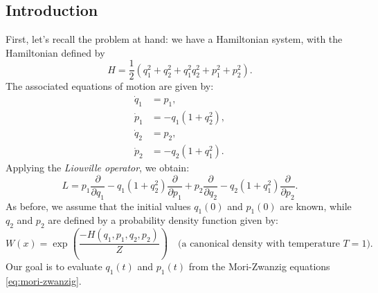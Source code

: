 \documentclass[12pt]{article}
\begin{document}
\subsection{Introduction}
First, let's recall the problem at hand: we have a Hamiltonian system, with the Hamiltonian defined by  
\begin{equation*}
    H = \frac{1}{2}(q_1^2 + q_2^2 + q_1^2 q_2^2 + p_1^2 + p_2^2).
\end{equation*}
The associated equations of motion are given by:
\begin{align*}
\dot{q}_1 & = p_1, \nonumber             \\
\dot{p}_1 & = -q_1(1 + q_2^2), \nonumber \\
    
\dot{q}_2 & = p_2, \nonumber             \\
    \dot{p}_2 & = -q_2(1 + q_1^2).
\end{align*}
Applying the \textit{Liouville operator}, we obtain:
\begin{equation*}
    
L = p_1 \frac{\partial}{\partial q_1} - q_1(1 + q_2^2)\frac{\partial}{\partial p_1}
    + p_2 \frac{\partial}{\partial q_2} - q_2(1 + q_1^2)\frac{\partial}{\partial p_2}.
\end{equation*}
As before, we assume that the initial values $q_1(0)$ and $p_1(0)$ are known, while $q_2$ and $p_2$ are defined by a probability density function given by:
\begin{equation*}
    
W(x) = \exp\left(\frac{-H(q_1,p_1,q_2,p_2)}{Z}\right) \quad \text{(a canonical density with temperature $T = 1$).}
\end{equation*}
Our goal is to evaluate $q_1(t)$ and $p_1(t)$ from the Mori-Zwanzig equations \eqref{eq:mori-zwanzig}.
\end{document}
